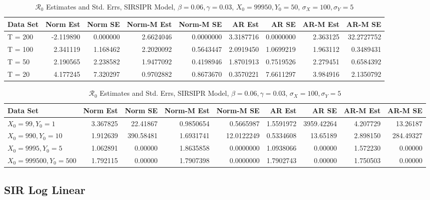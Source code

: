 \documentclass[12pt]{article}
\newcommand{\rr}{\ensuremath{\mathcal{R}_0}}
\begin{document}
\begin{table}[H]
	
	\caption{\label{tab:}$\rr$ Estimates and Std. Errs, SIRSIPR Model,
		$\beta = 0.06, \gamma = 0.03$, $X_0 = 99950, Y_0 = 50$, $\sigma_X = 100, \sigma_Y = 5$}
	\centering
	\begin{tabular}[t]{l|r|r|r|r|r|r|r|r}
		\hline
		Data Set & Norm Est & Norm SE & Norm-M Est & Norm-M SE & AR Est & AR SE & AR-M Est & AR-M SE\\
		\hline
		T = 200 & -2.119890 & 0.000000 & 2.6624046 & 0.0000000 & 3.3187716 & 0.0000000 & 2.363125 & 32.2727752\\
		\hline
		T = 100 & 2.341119 & 1.168462 & 2.2020092 & 0.5643447 & 2.0919450 & 1.0699219 & 1.963112 & 0.3489431\\
		\hline
		T = 50 & 2.190565 & 2.238582 & 1.9477092 & 0.4198946 & 1.8701913 & 0.7519526 & 2.279451 & 0.6584392\\
		\hline
		T = 20 & 4.177245 & 7.320297 & 0.9702882 & 0.8673670 & 0.3570221 & 7.6611297 & 3.984916 & 2.1350792\\
		\hline
	\end{tabular}
\end{table}

\begin{table}[H]
	
	\caption{\label{tab:}$\rr$ Estimates and Std. Errs, SIRSIPR Model,
		$\beta = 0.06, \gamma = 0.03$, $\sigma_X = 100, \sigma_Y = 5$}
	\centering
	\begin{tabular}[t]{l|r|r|r|r|r|r|r|r}
		\hline
		Data Set & Norm Est & Norm SE & Norm-M Est & Norm-M SE & AR Est & AR SE & AR-M Est & AR-M SE\\
		\hline
		$X_0 = 99, Y_0 = 1$ & 3.367825 & 22.41867 & 0.9850654 & 0.5665987 & 1.5591972 & 3959.42264 & 4.207729 & 13.26187\\
		\hline
		$X_0 = 990, Y_0 = 10$ & 1.912639 & 390.58481 & 1.6931741 & 12.0122249 & 0.5334608 & 13.65189 & 2.898150 & 284.49327\\
		\hline
		$X_0 = 9995, Y_0 = 5$ & 1.062891 & 0.00000 & 1.8635858 & 0.0000000 & 1.0938066 & 0.00000 & 1.572230 & 0.00000\\
		\hline
		$X_0 = 999500, Y_0 = 500$ & 1.792115 & 0.00000 & 1.7907398 & 0.0000000 & 1.7902743 & 0.00000 & 1.750503 & 0.00000\\
		\hline
	\end{tabular}
\end{table}

\subsection{SIR Log Linear}
\end{document}
